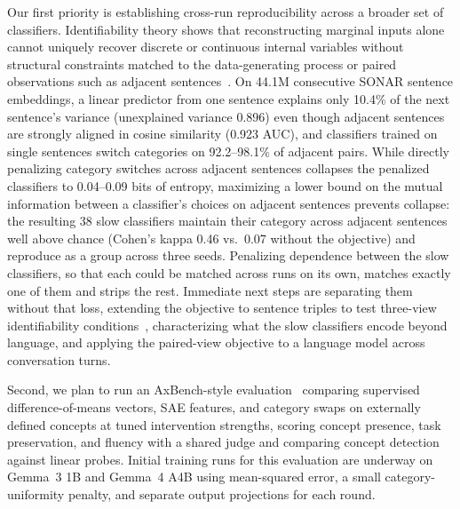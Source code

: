 \documentclass[11pt]{article}
\begin{document}
Our first priority is establishing cross-run reproducibility across a
broader set of classifiers. Identifiability theory shows that
reconstructing marginal inputs alone cannot uniquely recover discrete or
continuous internal variables without structural constraints matched to
the data-generating process or paired observations such as adjacent
sentences~\cite{locatello2019,hillar2015,allman2009,udr2020,pcl2017,slowvae2021,locatello2020,ivae2020,zimmermann2021}.
On 44.1M consecutive SONAR sentence embeddings, a linear predictor from
one sentence explains only 10.4\% of the next sentence's variance
(unexplained variance 0.896) even though adjacent sentences are strongly
aligned in cosine similarity (0.923 AUC), and classifiers trained on
single sentences switch categories on 92.2--98.1\% of adjacent pairs.
While directly penalizing category switches across adjacent sentences
collapses the penalized classifiers to 0.04--0.09 bits of entropy,
maximizing a lower bound on the mutual information between a classifier's
choices on adjacent sentences prevents collapse: the resulting 38 slow
classifiers maintain their category across adjacent sentences well above
chance (Cohen's kappa 0.46 vs.\ 0.07 without the objective) and reproduce
as a group across three seeds. Penalizing dependence between the slow
classifiers, so that each could be matched across runs on its own,
matches exactly one of them and strips the rest. Immediate next steps
are separating them without that loss, extending the objective to
sentence triples to test
three-view identifiability conditions~\cite{allman2009}, characterizing
what the slow classifiers encode beyond language, and applying the
paired-view objective to a language model across conversation turns.

Second, we plan to run an AxBench-style evaluation~\cite{wu2025axbenchsteeringllmssimple}
comparing supervised difference-of-means vectors, SAE features, and
category swaps on externally defined concepts at tuned intervention
strengths, scoring concept presence, task preservation, and fluency with a
shared judge and comparing concept detection against linear probes.
Initial training runs for this evaluation are underway on Gemma~3 1B and
Gemma~4 A4B using mean-squared error, a small category-uniformity penalty,
and separate output projections for each round.

\printbibliography

\wugaru{24pt}
\end{document}
